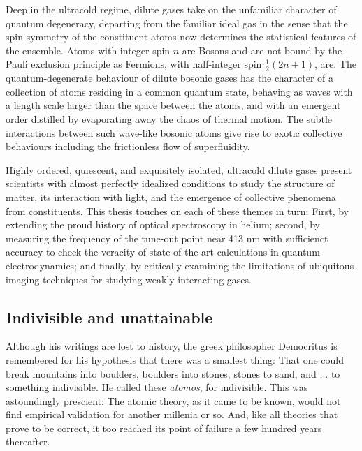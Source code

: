 	Deep in the ultracold regime, dilute gases take on the unfamiliar character of quantum degeneracy, departing from the familiar ideal gas in the sense that the spin-symmetry of the constituent atoms now determines the statistical features of the ensemble. Atoms with integer spin $n$ are Bosons and are not bound by the Pauli exclusion principle as Fermions, with half-integer spin $\frac{1}{2}(2n+1)$, are. The quantum-degenerate behaviour of dilute bosonic gases has the character of a collection of atoms residing in a common quantum state, behaving as waves with a length scale larger than the space between the atoms, and with an emergent order distilled by evaporating away the chaos of thermal motion. The subtle interactions between such wave-like bosonic atoms give rise to exotic collective behaviours including the frictionless flow of superfluidity.

	Highly ordered, quiescent, and exquisitely isolated, ultracold dilute gases present scientists with almost perfectly idealized conditions to study the structure of matter, its interaction with light, and the emergence of collective phenomena from constituents. This thesis touches on each of these themes in turn: First, by extending the proud history of optical spectroscopy in helium; second, by measuring the frequency of the tune-out point near 413 nm with sufficienct accuracy to check the veracity of state-of-the-art calculations in quantum electrodynamics; and finally, by critically examining the limitations of ubiquitous imaging techniques for studying weakly-interacting gases.

\subsection*{Indivisible and unattainable}


	Although his writings are lost to history, the greek philosopher Democritus is remembered for his hypothesis that there was a smallest thing: That one could break mountains into boulders, boulders into stones, stones to sand, and ... to something indivisible. He called these \emph{atomos}, for indivisible.	This was astoundingly prescient: The atomic theory, as it came to be known, would not find empirical validation for another millenia or so.	And, like all theories that prove to be correct, it too reached its point of failure a few hundred years thereafter. 

